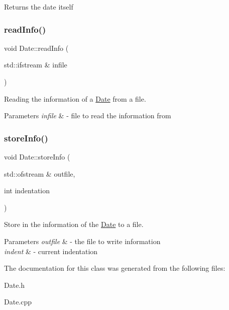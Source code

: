 \begin{DoxyReturn}{Returns}
the date itself 
\end{DoxyReturn}
\mbox{\label{class_date_ad23dffa000ed62018a399c519acb06db}} 
\subsubsection{\texorpdfstring{read\+Info()}{readInfo()}}
{\footnotesize\ttfamily void Date\+::read\+Info (\begin{DoxyParamCaption}\item[{std\+::ifstream \&}]{infile }\end{DoxyParamCaption})}



Reading the information of a \mbox{\hyperlink{class_date}{Date}} from a file. 


\begin{DoxyParams}{Parameters}
{\em infile} & -\/ file to read the information from \\
\hline
\end{DoxyParams}
\mbox{\label{class_date_a9385a826469d0978e3491bdff9739f6f}} 
\subsubsection{\texorpdfstring{store\+Info()}{storeInfo()}}
{\footnotesize\ttfamily void Date\+::store\+Info (\begin{DoxyParamCaption}\item[{std\+::ofstream \&}]{outfile,  }\item[{int}]{indentation }\end{DoxyParamCaption})}



Store in the information of the \mbox{\hyperlink{class_date}{Date}} to a file. 


\begin{DoxyParams}{Parameters}
{\em outfile} & -\/ the file to write information \\
\hline
{\em indent} & -\/ current indentation \\
\hline
\end{DoxyParams}


The documentation for this class was generated from the following files\+:\begin{DoxyCompactItemize}
\item 
Date.\+h\item 
Date.\+cpp\end{DoxyCompactItemize}
